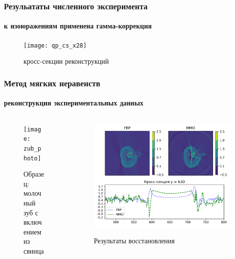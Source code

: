 \begin{frame}
\frametitle{Резульататы численного эксперимента}
\framesubtitle{к изоюражениям применена гамма-коррекция}

\begin{figure}
  \centering
  \texttt{[image: qp\_cs\_x28]}
  \caption{кросс-секции реконструкций}
  \label{fig:sample}
\end{figure}

\end{frame}


\begin{frame}
\frametitle{Метод мягких неравенств}
\framesubtitle{реконструкция экспериментальных данных}

\centering
\vspace{-0.3cm}
\begin{columns}
\vspace{-1.2cm}
\begin{column}{0.3\textwidth}
\begin{figure}
    \texttt{[image: zub\_photo]}
    \caption{Образец: молочный зуб с включением из свинца}
\end{figure}
\end{column}

\begin{column}{0.85\textwidth}
\vspace{-0.3cm}
\begin{figure}
    \centering
    \includegraphics[width=\textwidth]{../Dissertation/images/part2_img/pb_big__fbp_vs_soft__cs__viridis} \\

    \caption{Результаты восстановления}
    \label{fig:fbp_vs_soft__zub}
\end{figure}
\end{column}
\end{columns}

\end{frame}

